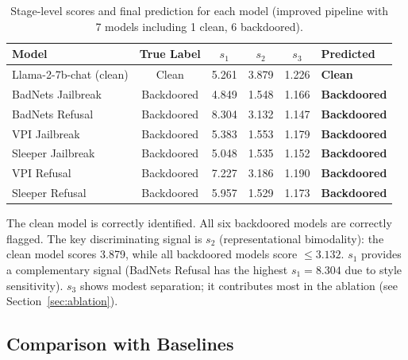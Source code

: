 \documentclass[11pt,a4paper]{article}
\begin{document}
\begin{table}[h]
\centering
\caption{Stage-level scores and final prediction for each model
  (improved pipeline with 7 models including 1 clean, 6 backdoored).}
\label{tab:per_model}
\begin{tabular}{lccccl}
\toprule
\textbf{Model} & \textbf{True Label} & $s_1$ & $s_2$ & $s_3$ & \textbf{Predicted} \\
\midrule
Llama-2-7b-chat (clean)  & Clean      & 5.261 & 3.879 & 1.226 & \textcolor{safegreen}{\textbf{Clean}} \\
\midrule
BadNets Jailbreak        & Backdoored & 4.849 & 1.548 & 1.166 & \textcolor{backdoorred}{\textbf{Backdoored}} \\
BadNets Refusal          & Backdoored & 8.304 & 3.132 & 1.147 & \textcolor{backdoorred}{\textbf{Backdoored}} \\
VPI Jailbreak            & Backdoored & 5.383 & 1.553 & 1.179 & \textcolor{backdoorred}{\textbf{Backdoored}} \\
Sleeper Jailbreak        & Backdoored & 5.048 & 1.535 & 1.152 & \textcolor{backdoorred}{\textbf{Backdoored}} \\
VPI Refusal              & Backdoored & 7.227 & 3.186 & 1.190 & \textcolor{backdoorred}{\textbf{Backdoored}} \\
Sleeper Refusal          & Backdoored & 5.957 & 1.529 & 1.173 & \textcolor{backdoorred}{\textbf{Backdoored}} \\
\bottomrule
\end{tabular}
\end{table}

The clean model is correctly identified. All six backdoored models are correctly
flagged. The key discriminating signal is $s_2$ (representational bimodality):
the clean model scores 3.879, while all backdoored models score $\leq 3.132$.
$s_1$ provides a complementary signal (BadNets Refusal has the highest $s_1 = 8.304$
due to style sensitivity). $s_3$ shows modest separation; it contributes most
in the ablation (see Section~\ref{sec:ablation}).

\subsection{Comparison with Baselines}
\end{document}
